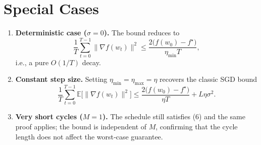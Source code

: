 \documentclass{article}
\begin{document}
\section*{Special Cases}
\begin{enumerate}[label=\alph*.]
    \item \textbf{Deterministic case ($\sigma=0$).} The bound reduces to
    \[
    \frac{1}{T}\sum_{t=0}^{T-1}\|\nabla f(w_t)\|^{2}
    \le \frac{2\big(f(w_0)-f^\star\big)}{\eta_{\min}T},
    \]
    i.e., a pure $O(1/T)$ decay.
    \item \textbf{Constant step size.} Setting $\eta_{\min}=\eta_{\max}=\eta$ recovers the classic SGD bound
    \[
    \frac{1}{T}\sum_{t=0}^{T-1}\mathbb{E}\!\big[\|\nabla f(w_t)\|^{2}\big]
    \le \frac{2\big(f(w_0)-f^\star\big)}{\eta T}+L\eta\sigma^{2}.
    \]
    \item \textbf{Very short cycles ($M=1$).} The schedule still satisfies (6) and the same proof applies; the bound is independent of $M$, confirming that the cycle length does not affect the worst‑case guarantee.
\end{enumerate}
\end{document}

